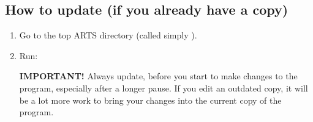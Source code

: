\subsection{How to update (if you already have a copy)}
\begin{enumerate}
\item Go to the top ARTS directory (called simply ).
\item Run: 
   
  \textbf{IMPORTANT!} Always update, before you start to make changes
  to the program, especially after a longer pause. If you edit an
  outdated copy, it will be a lot more work to bring your changes into
  the current copy of the program.
\end{enumerate}


